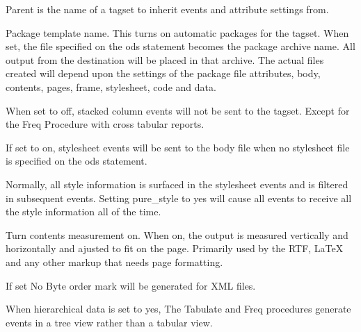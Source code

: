 \begin{description}


Parent is the name of a tagset to inherit events and attribute settings from.


Package template name.  This turns on automatic packages for the tagset.
When set, the file specified on the ods statement becomes the package archive
name. All output from the destination will be placed in that archive.  The
actual files created will depend upon the settings of the package file attributes,
body, contents, pages, frame, stylesheet, code and data.


When set to off, stacked column events will not be sent to the tagset.  Except for
the Freq Procedure with cross tabular reports.


If set to on, stylesheet events will be sent to the body file when no stylesheet
file is specified on the ods statement.


Normally, all style information is surfaced in the stylesheet events and is filtered
in subsequent events.  Setting pure\_style to yes will cause all events to receive all
the style information all of the time.


Turn contents measurement on.  When on, the output is measured vertically and
horizontally and ajusted to fit on the page.  Primarily used by the RTF, LaTeX
and any other markup that needs page formatting.


If set No Byte order mark will be generated for XML files.


When hierarchical data is set to yes, The Tabulate and Freq procedures
generate events in a tree view rather than a tabular view.



\end{description}

